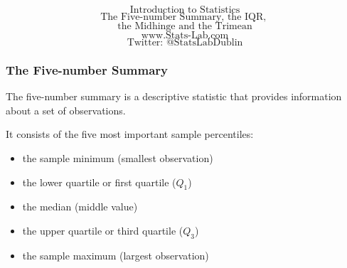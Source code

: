 \documentclass{beamer}
\begin{document}
\begin{frame}
\Huge
\[\mbox{Introduction to Statistics}\]
\huge
\[\mbox{The Five-number Summary, the IQR,  }\]
\[\mbox{the Midhinge and the Trimean}\]
\Large
\[\mbox{www.Stats-Lab.com}\]
\[\mbox{Twitter: @StatsLabDublin}\]
\end{frame}
\begin{frame}
\frametitle{The Five-number Summary}
\Large
The five-number summary is a descriptive statistic that provides information about a set of observations. 

It consists of the five most important sample percentiles:
\begin{itemize}
\item the sample minimum (smallest observation)
\item the lower quartile or first quartile ($Q_1$)
\item the median (middle value)
\item the upper quartile or third quartile ($Q_3$)
\item the sample maximum (largest observation)
\end{itemize}
\end{frame}
\end{document}
